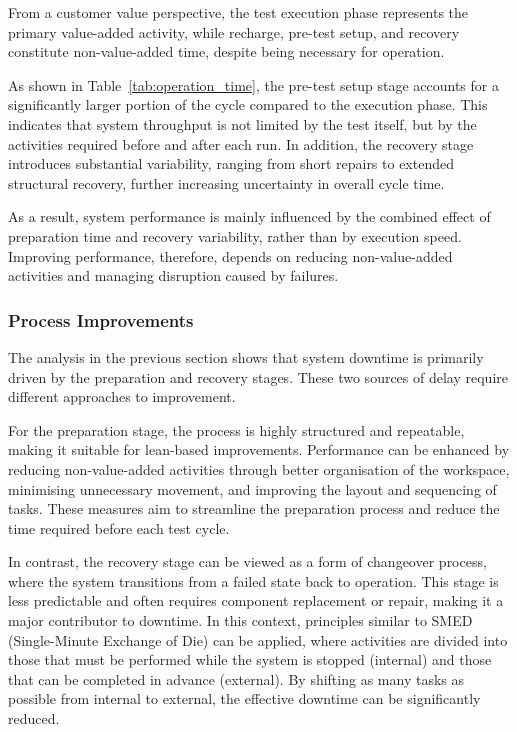 \documentclass[a4paper,11pt]{article}
\begin{document}
From a customer value perspective, the test execution phase represents the primary value-added activity, while recharge, pre-test setup, and recovery constitute non-value-added time, despite being necessary for operation.

As shown in Table~\ref{tab:operation_time}, the pre-test setup stage accounts for a significantly larger portion of the cycle compared to the execution phase. This indicates that system throughput is not limited by the test itself, but by the activities required before and after each run. In addition, the recovery stage introduces substantial variability, ranging from short repairs to extended structural recovery, further increasing uncertainty in overall cycle time.

As a result, system performance is mainly influenced by the combined effect of preparation time and recovery variability, rather than by execution speed. Improving performance, therefore, depends on reducing non-value-added activities and managing disruption caused by failures.

\subsubsection{Process Improvements}

The analysis in the previous section shows that system downtime is primarily driven by the preparation and recovery stages. These two sources of delay require different approaches to improvement.

For the preparation stage, the process is highly structured and repeatable, making it suitable for lean-based improvements. Performance can be enhanced by reducing non-value-added activities through better organisation of the workspace, minimising unnecessary movement, and improving the layout and sequencing of tasks. These measures aim to streamline the preparation process and reduce the time required before each test cycle.

In contrast, the recovery stage can be viewed as a form of changeover process, where the system transitions from a failed state back to operation. This stage is less predictable and often requires component replacement or repair, making it a major contributor to downtime. In this context, principles similar to SMED (Single-Minute Exchange of Die) can be applied, where activities are divided into those that must be performed while the system is stopped (internal) and those that can be completed in advance (external). By shifting as many tasks as possible from internal to external, the effective downtime can be significantly reduced.
\end{document}
